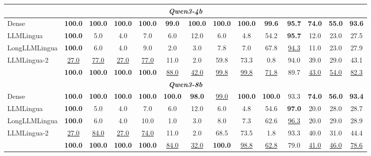 \documentclass[11pt]{article}
\newcommand{\ours}{\text{BEAVER}\xspace}
\begin{document}
\begin{table}[t]
{\begin{tabular}{l | ccc | cccccc | c | cc | c}
            \multicolumn{14}{c}{\textbf{\textit{Qwen3-4b}}} \\
            \midrule
            Dense     & \textbf{100.0} & \textbf{100.0} & \textbf{100.0} & \textbf{100.0} & \textbf{99.0} & \textbf{100.0} & \textbf{100.0} & \textbf{100.0} & \textbf{99.6} & \textbf{95.7} & \textbf{74.0} & \textbf{55.0} & \textbf{93.6} \\
            LLMLingua  & \textbf{100.0} & 5.0 & 4.0 & 7.0 & 6.0 & 12.0 & 6.0 & 4.8 & 54.2 & \textbf{95.7} & 12.0 & 23.0 & 27.5 \\
            LongLLMLingua  & \textbf{100.0} & 6.0 & 4.0 & 9.0 & 2.0 & 3.0 & 7.8 & 7.0 & 67.8 & \underline{94.3} & 11.0 & 23.0 & 27.9 \\
            LLMLingua-2  & \underline{27.0} & \underline{77.0} & \underline{27.0} & \underline{77.0} & 11.0 & 2.0 & 59.8 & 73.3 & 0.8 & 94.0 & 39.0 & 29.0 & 43.1 \\
            \rowcolor{blue!5} 
            \textbf{\ours} & \textbf{100.0} & \textbf{100.0} & \textbf{100.0} & \textbf{100.0} & \underline{88.0} & \underline{42.0} & \underline{99.8} & \underline{99.8} & \underline{71.8} & 89.7 & \underline{43.0} & \underline{54.0} & \underline{82.3} \\
            \midrule

            \multicolumn{14}{c}{\textbf{\textit{Qwen3-8b}}} \\
            \midrule
            Dense     & \textbf{100.0} & \textbf{100.0} & \textbf{100.0} & \textbf{100.0} & \textbf{100.0} & \textbf{98.0} & \underline{99.0} & \textbf{100.0} & \textbf{100.0} & 93.3 & \textbf{74.0} & \textbf{56.0} & \textbf{93.4} \\
            LLMLingua  & \textbf{100.0} & 5.0 & 4.0 & 7.0 & 6.0 & 12.0 & 6.0 & 4.8 & 54.6 & \textbf{97.0} & 20.0 & 28.0 & 28.7 \\
            LongLLMLingua  & \textbf{100.0} & 6.0 & 4.0 & 10.0 & 1.0 & 3.0 & 8.0 & 7.3 & 62.6 & \underline{96.3} & 20.0 & 29.0 & 28.9 \\
            LLMLingua-2  & \underline{27.0} & \underline{84.0} & \underline{27.0} & \underline{74.0} & 11.0 & 2.0 & 68.5 & 73.5 & 1.8 & 93.3 & 40.0 & 31.0 & 44.4 \\
            \rowcolor{blue!5} 
            \textbf{\ours} & \textbf{100.0} & \textbf{100.0} & \textbf{100.0} & \textbf{100.0} & \underline{84.0} & \underline{32.0} & \textbf{100.0} & \underline{98.8} & \underline{62.8} & 79.0 & \underline{41.0} & \underline{46.0} & \underline{78.6} \\
            \midrule


\end{tabular}}
\end{table}
\end{document}
